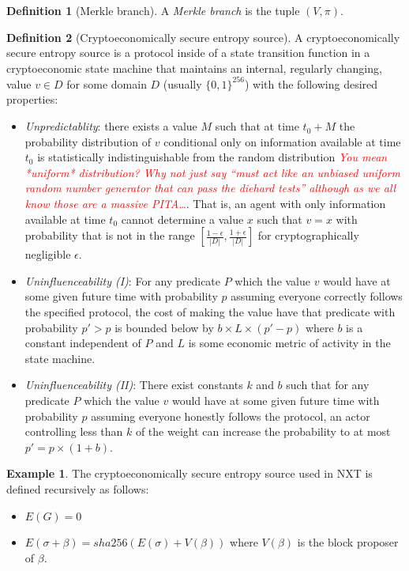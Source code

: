 \documentclass[11pt,a4paper]{report}
\newcommand{\comment}[1]{\textcolor{red}{\textit{#1}}}
\theoremstyle{plain}
\theoremstyle{definition}
\newtheorem{defn}{Definition}[chapter]
\newtheorem{exmp}{Example}[section]
\theoremstyle{remark}
\begin{document}
\begin{defn}[Merkle branch]
A \emph{Merkle branch} is the tuple $(V, \pi)$.
\end{defn}

\begin{defn}[Cryptoeconomically secure entropy source]
A cryptoeconomically secure entropy source is a protocol inside of a state transition function in a cryptoeconomic state machine that maintains an internal, regularly changing, value $v \in D$ for some domain $D$ (usually $\{0,1\}^{256}$) with the following desired properties:
\begin{itemize}
\item \emph{Unpredictablity}: there exists a value $M$ such that at time $t_0 + M$ the probability distribution of $v$ conditional only on information available at time $t_0$ is statistically indistinguishable from the random distribution \comment{You mean *uniform* distribution?  Why not just say ``must act like an unbiased uniform random number generator that can pass the diehard tests'' although as we all know those are a massive PITA\ldots}. That is, an agent with only information available at time $t_0$ cannot determine a value $x$ such that $v = x$ with probability that is not in the range $[\frac{1 - \epsilon}{|D|}, \frac{1 + \epsilon}{|D|}]$ for cryptographically negligible $\epsilon$.
\item \emph{Uninfluenceability (I)}: For any predicate $P$ which the value $v$ would have at some given future time with probability $p$ assuming everyone correctly follows the specified protocol, the cost of making the value have that predicate with probability $p' > p$ is bounded below by $b \times  L \times  (p' - p)$ where $b$ is a constant independent of $P$ and $L$ is some economic metric of activity in the state machine.
\item \emph{Uninfluenceability (II)}: There exist constants $k$ and $b$ such that for any predicate $P$ which the value $v$ would have at some given future time with probability $p$ assuming everyone honestly follows the protocol, an actor controlling less than $k$ of the weight can increase the probability to at most $p' = p \times  (1 + b)$.
\end{itemize}
\end{defn}

\begin{exmp}
The cryptoeconomically secure entropy source used in NXT \citep{nxt_community_nxt_2014} is defined recursively as follows:
\begin{itemize}
\item
$E(G) = 0$
\item 
$E(\sigma + \beta) = sha256(E(\sigma) + V(\beta))$ where $V(\beta)$ is the block proposer of $\beta$.
\end{itemize}
\end{exmp}
\end{document}
